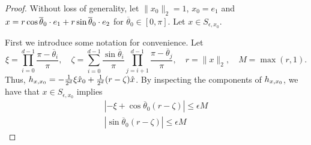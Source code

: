 \documentclass[11pt]{article}
\newcommand{\eps}{\epsilon}
\newcommand{\thetabar}{\overline{\theta}}
\newcommand{\red}[1]{{\color{black} #1}}
\newcommand{\xo}{x_0}
\newcommand{\xhat}{\hat{x}}
\newcommand{\xohat}{\hat{x}_0}
\newcommand{\Sepsxo}{S_{\eps, \xo}}
\newcommand{\hxxo}{h_{x, \xo}}
\newcommand{\Pipithetapii}{\prod_{i=0}^{d-1} \frac{\pi - \thetabar_i}{\pi}}
\newcommand{\zetaterm}{\sum_{i=0}^{d-1} \frac{\sin \thetabar_i}{\pi} \prod_{j=i+1}^{d-1} \frac{\pi - \thetabar_j}{\pi}}
\begin{document}
\begin{proof}
Without loss of generality, let $\|\xo\|_2=1$, $\xo = e_1$ and $\red{x} = r \cos \thetabar_0 \cdot e_1 + r \sin \thetabar_0 \cdot e_2$ for $\thetabar_0 \in [0, \pi]$.  Let $x \in \Sepsxo$. 

First we introduce some notation for convenience.  Let
\[
\xi = \Pipithetapii, \quad \zeta = \zetaterm, \quad r = \|x\|_2, \quad M = \max(r, 1).
\]
Thus, $\hxxo = - \red{\frac{1}{2^d}}\xi  \xohat + \red{\frac{1}{2^d}} (r- \zeta) \xhat$. 
By inspecting the components of $\red{\hxxo}$, we have that $x\in \Sepsxo$ implies
\begin{align}
|-\xi + \cos \thetabar_0 ( r - \zeta)| \leq \eps M \label{Seps-e1term}\\
|\sin \thetabar_0 (r - \zeta)| \leq \eps M \label{Seps-e2term}
\end{align}


\end{proof}
\end{document}
